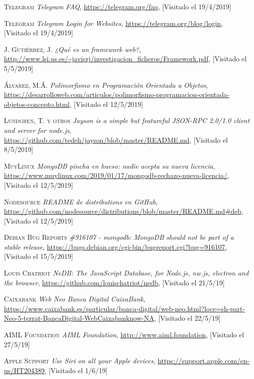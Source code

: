 \documentclass[spanish,12pt, a4paper, twoside]{paper}
\begin{document}
\begin{thebibliography}{00}
 \textsc{Telegram} \textit{Telegram FAQ}, \url{https://telegram.org/faq}, [Visitado el 19/4/2019]

 \textsc{Telegram} \textit{Telegram Login for Websites}, \url{https://telegram.org/blog/login}, [Visitado el 19/4/2019]

 \textsc{J. Gutiérrez, J.} \textit{¿Qué es un framework web?}, \url{http://www.lsi.us.es/~javierj/investigacion_ficheros/Framework.pdf}, [Visitado el 5/5/2019]

 \textsc{Álvarez, M.Á.} \textit{Polimorfismo en Programación Orientada a Objetos}, \url{https://desarrolloweb.com/articulos/polimorfismo-programacion-orientada-objetos-concepto.html}, [Visitado el 12/5/2019]

 \textsc{Lundgren, T. y otros} \textit{Jayson is a simple but featureful JSON-RPC 2.0/1.0 client and server for node.js}, \url{https://github.com/tedeh/jayson/blob/master/README.md}, [Visitado el 8/5/2019]

 \textsc{MuyLinux} \textit{MongoDB pincha en hueso: nadie acepta su nueva licencia}, \url{https://www.muylinux.com/2019/01/17/mongodb-rechazo-nueva-licencia/}, [Visitado el 12/5/2019]

 \textsc{Nodesource} \textit{README de distributions en GitHub}, \url{https://github.com/nodesource/distributions/blob/master/README.md#deb}, [Visitado el 12/5/2019]

 \textsc{Debian Bug Reports} \textit{\#916107 - mongodb: MongoDB should not be part of a stable release}, \url{https://bugs.debian.org/cgi-bin/bugreport.cgi?bug=916107}, [Visitado el 15/5/2019]

 \textsc{Louis Chatriot} \textit{NeDB: The JavaScript Database, for Node.js, nw.js, electron and the browser}, \url{https://github.com/louischatriot/nedb}, [Visitado el 21/5/19]

 \textsc{Caixabank} \textit{Web Neo \textbar Banca Digital \textbar CaixaBank}, \url{https://www.caixabank.es/particular/banca-digital/web-neo.html?loce=sh-part-Neo-5-terrat-BancaDigital-WebCaixabanknow-NA}, [Visitado el 22/5/19]

 \textsc{AIML Foundation} \textit{AIML Foundation}, \url{http://www.aiml.foundation}, [Visitado el 27/5/19]

 \textsc{Apple Support} \textit{Use Siri on all your Apple devices}, \url{https://support.apple.com/en-us/HT204389}, [Visitado el 1/6/19]


\end{thebibliography}
\end{document}
